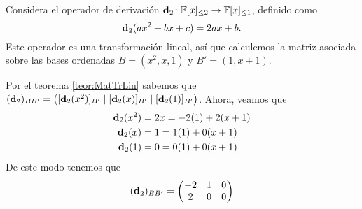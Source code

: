 \begin{example}
  Considera el operador de derivación $\mathbf{d}_2 \colon \mathbb{F}[x]_{\leq 2} \to \mathbb{F}[x]_{\leq 1}$, definido como
    \[
      \mathbf{d}_2 (ax^2 + bx + c) = 2ax + b.
    \]
  Este operador es una transformación lineal, así que calculemos la matriz asociada sobre las bases ordenadas $B = (x^2, x, 1)$ y $B' = (1, x+1)$.

  \examplesolution
  
  Por el teorema \ref{teor:MatTrLin} sabemos que $(\mathbf{d}_2)_{BB'} = \bigl( [\mathbf{d}_2(x^2)]_{B'} \mid [\mathbf{d}_2(x)]_{B'} \mid [\mathbf{d}_2(1)]_{B'} \bigr)$. Ahora, veamos que
  \begin{align}
    \mathbf{d}_2(x^2) &= 2x = -2(1) + 2(x+1) \\
    \mathbf{d}_2(x)   &= 1  = 1(1) + 0(x+1) \\
    \mathbf{d}_2(1)   &= 0  = 0(1) + 0(x+1) \\
  \end{align}
  De este modo tenemos que 
    \[ (\mathbf{d}_2)_{BB'} = \begin{pmatrix}
      -2 & 1 & 0 \\
      2 & 0 & 0
    \end{pmatrix} \]
\end{example}

